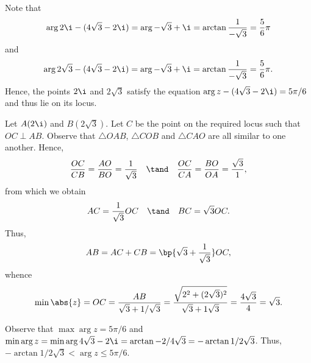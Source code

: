 \begin{solution}
    \begin{ppart}
        Note that \[\arg{2\i - (4\sqrt3 - 2\i)} = \arg{-\sqrt3 + \i} = \arctan \frac1{-\sqrt3} = \frac56\pi\] and \[\arg{2\sqrt3 - (4\sqrt3 - 2\i)} = \arg{-\sqrt3 + \i} = \arctan \frac1{-\sqrt3} = \frac56\pi.\] Hence, the points $2\i$ and $2\sqrt3$ satisfy the equation $\arg{z - (4\sqrt3 - 2\i)} = 5\pi/6$ and thus lie on its locus.
    \end{ppart}
    \begin{ppart}
        Let $A(2\i)$ and $B(2\sqrt3)$. Let $C$ be the point on the required locus such that $OC \perp AB$. Observe that $\triangle OAB$, $\triangle COB$ and $\triangle CAO$ are all similar to one another. Hence,\[\frac{OC}{CB} = \frac{AO}{BO} = \frac1{\sqrt3} \quad \tand \quad \frac{OC}{CA} = \frac{BO}{OA} = \frac{\sqrt3}1,\] from which we obtain \[AC = \frac1{\sqrt3} OC \quad \tand \quad BC = \sqrt3 OC.\] Thus, \[AB = AC + CB = \bp{\sqrt3 + \frac1{\sqrt3}} OC,\] whence \[\min \abs{z} = OC = \frac{AB}{\sqrt3 + 1/\sqrt3} = \frac{\sqrt{2^2 + (2\sqrt3)^2}}{\sqrt3 + 1\sqrt{3}} = \frac{4\sqrt3}{4} = \sqrt3.\] 
        
        Observe that $\max \arg{z} = 5\pi/6$ and $\min \arg{z} = \min \arg{4\sqrt3 - 2\i} = \arctan{-2/4\sqrt3} = -\arctan{1/2\sqrt3}$. Thus, $-\arctan{1/2\sqrt3} < \arg{z} \leq 5\pi/6$.
    \end{ppart}
\end{solution}

